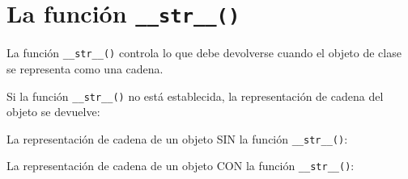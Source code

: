 \section{\texorpdfstring{La función \texttt{\_\_str\_\_()}}{La función \_\_str\_\_()}}

La función \texttt{\_\_str\_\_()} controla lo que debe devolverse cuando
el objeto de clase se representa como una cadena.

Si la función \texttt{\_\_str\_\_()} no está establecida, la
representación de cadena del objeto se devuelve:

\begin{code}
La representación de cadena de un objeto SIN la función \texttt{\_\_str\_\_()}:

\begin{Shaded}
\begin{Highlighting}[]
   \NormalTok{(}
    \OperatorTok{=}
    \OperatorTok{=}

\OperatorTok{=}\NormalTok{, }\NormalTok{)}


\end{Highlighting}
\end{Shaded}
\end{code}

\begin{code}
La representación de cadena de un objeto CON la función \texttt{\_\_str\_\_()}:

\begin{Shaded}
\begin{Highlighting}[]
   \NormalTok{(}
    \OperatorTok{=}
    \OperatorTok{=}

   \NormalTok{(}\NormalTok{):}
     \SpecialCharTok{\{}\SpecialCharTok{\}}\SpecialStringTok{(}\SpecialCharTok{\{}\SpecialCharTok{\}}

\OperatorTok{=}\NormalTok{, }\NormalTok{)}


\end{Highlighting}
\end{Shaded}
\end{code}

